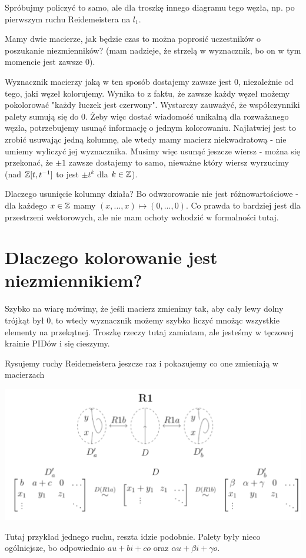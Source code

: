 \documentclass{article}
\begin{document}
Spróbujmy policzyć to samo, ale dla troszkę innego diagramu tego węzła, np. po pierwszym ruchu Reidemeistera na $l_1$.

Mamy dwie macierze, jak będzie czas to można poprosić uczestników o poszukanie niezmienników? (mam nadzieje, że strzelą w wyznacznik, bo on w tym momencie jest zawsze $0$).

Wyznacznik macierzy jaką w ten sposób dostajemy zawsze jest $0$, niezależnie od tego, jaki węzeł kolorujemy. Wynika to z faktu, że zawsze każdy węzeł możemy pokolorować "każdy łuczek jest czerwony". Wystarczy zauważyć, że współczynniki palety sumują się do $0$. Żeby więc dostać wiadomość unikalną dla rozważanego węzła, potrzebujemy usunąć informację o jednym kolorowaniu. Najłatwiej jest to zrobić usuwając jedną kolumnę, ale wtedy mamy macierz niekwadratową - nie umiemy wyliczyć jej wyznacznika. Musimy więc usunąć jeszcze wiersz - można się przekonać, że $\pm1$ zawsze dostajemy to samo, nieważne który wiersz wyrzucimy (nad $\mathbb{Z}[t, t^{-1}]$ to jest $\pm t^{k}$ dla $k\in\mathbb{Z}$). 

Dlaczego usunięcie kolumny działa? Bo odwzorowanie nie jest różnowartościowe - dla każdego $x\in\mathbb{Z}$ mamy $(x,...,x)\mapsto (0,...,0)$. Co prawda to bardziej jest dla przestrzeni wektorowych, ale nie mam ochoty wchodzić w formalności tutaj.

\section{Dlaczego kolorowanie jest niezmiennikiem?}

Szybko na wiarę mówimy, że jeśli macierz zmienimy tak, aby cały lewy dolny trójkąt był $0$, to wtedy wyznacznik możemy szybko liczyć mnożąc wszystkie elementy na przekątnej. Troszkę rzeczy tutaj zamiatam, ale jesteśmy w tęczowej krainie PIDów i się cieszymy.

Rysujemy ruchy Reidemeistera jeszcze raz i pokazujemy co one zmieniają w macierzach
\begin{center}
  \includegraphics[width=15cm]{R1_matrices.png}

  Tutaj przykład jednego ruchu, reszta idzie podobnie. Palety były nieco ogólniejsze, bo odpowiednio $au+bi+co$ oraz $\alpha u+\beta i+\gamma o$.
\end{center}
\end{document}

